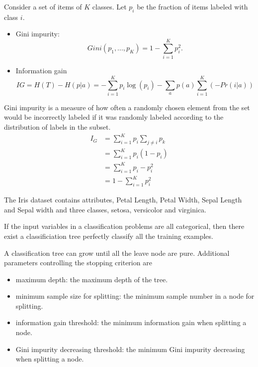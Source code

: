 \begin{refsection}
\begin{method}
Consider a set of items of $K$ classes. Let $p_i$ be the fraction of items labeled with class $i$. 


\begin{itemize}
	\item Gini impurity: 
	$$Gini(p_1,...,p_K) = 1 - \sum_{i=1}^K p_i^2.$$
	\item Information gain
	$$IG = H(T) - H(p|a) = -\sum_{i=1}^K p_i\log(p_i) - \sum_a p(a)\sum_{i=1}^K(-Pr(i|a))$$
\end{itemize}	
\end{method}

\begin{remark}
Gini impurity is a measure of how often a randomly chosen element from the set would be incorrectly labeled if it was randomly labeled according to the distribution of labels in the subset.	
\begin{align*}
I_G &= \sum_{i=1}^K p_i \sum_{j\neq i}p_k\\
&=\sum_{i=1}^K p_i(1-p_i) \\
&=\sum_{i=1}^K p_i-p_i^2 \\
&=1 - \sum_{i=1}^K p_i^2
\end{align*}	
\end{remark}


\begin{remark}
The Iris dataset contains attributes, Petal Length, Petal Width, Sepal Length and Sepal width and three classes, setosa, versicolor and virginica.	

\end{remark}




\begin{remark}
If the input variables in a classification problems are all categorical, then there exist a classificiation tree perfectly classify all the training examples.	
\end{remark}



\begin{remark}
A classification tree can grow until all the leave node are pure. Additional parameters controlling the stopping criterion are
\begin{itemize}
	\item maximum depth: the maximum depth of the tree.
	\item minimum sample size for splitting: the minimum sample number in a node for splitting.
	\item information gain threshold: the minimum information gain when splitting a node. 
	\item Gini impurity decreasing threshold: the minimum Gini impurity decreasing when splitting a node.
\end{itemize}	
\end{remark}




\end{refsection}
